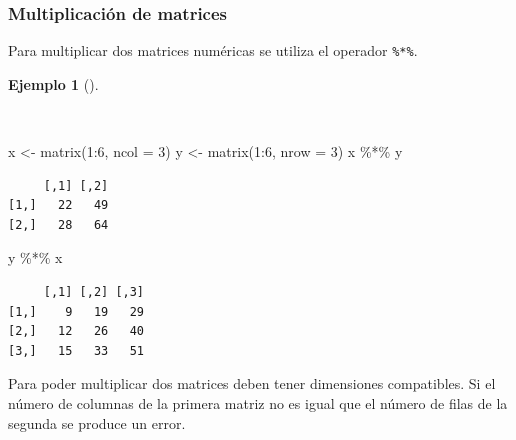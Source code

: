 \documentclass[
  a4paper,
]{scrreport}
\newenvironment{Shaded}{\begin{snugshade}}{\end{snugshade}}
\newcommand{\AttributeTok}[1]{\textcolor[rgb]{0.40,0.45,0.13}{#1}}
\newcommand{\DecValTok}[1]{\textcolor[rgb]{0.68,0.00,0.00}{#1}}
\newcommand{\FunctionTok}[1]{\textcolor[rgb]{0.28,0.35,0.67}{#1}}
\newcommand{\NormalTok}[1]{\textcolor[rgb]{0.00,0.23,0.31}{#1}}
\newcommand{\OtherTok}[1]{\textcolor[rgb]{0.00,0.23,0.31}{#1}}
\newcommand{\SpecialCharTok}[1]{\textcolor[rgb]{0.37,0.37,0.37}{#1}}
\theoremstyle{definition}
\theoremstyle{definition}
\newtheorem{example}{Ejemplo}[chapter]
\theoremstyle{remark}
\begin{document}
\subsubsection{Multiplicación de
matrices}\label{multiplicaciuxf3n-de-matrices}

Para multiplicar dos matrices numéricas se utiliza el operador
\texttt{\%*\%}.

\begin{example}[]\protect\hypertarget{exm-producto-matrices}{}\label{exm-producto-matrices}

~

\begin{Shaded}
\begin{Highlighting}[]
\NormalTok{x }\OtherTok{\textless{}{-}} \FunctionTok{matrix}\NormalTok{(}\DecValTok{1}\SpecialCharTok{:}\DecValTok{6}\NormalTok{, }\AttributeTok{ncol =} \DecValTok{3}\NormalTok{)}
\NormalTok{y }\OtherTok{\textless{}{-}} \FunctionTok{matrix}\NormalTok{(}\DecValTok{1}\SpecialCharTok{:}\DecValTok{6}\NormalTok{, }\AttributeTok{nrow =} \DecValTok{3}\NormalTok{)}
\NormalTok{x }\SpecialCharTok{\%*\%}\NormalTok{ y}
\end{Highlighting}
\end{Shaded}

\begin{verbatim}
     [,1] [,2]
[1,]   22   49
[2,]   28   64
\end{verbatim}

\begin{Shaded}
\begin{Highlighting}[]
\NormalTok{y }\SpecialCharTok{\%*\%}\NormalTok{ x}
\end{Highlighting}
\end{Shaded}

\begin{verbatim}
     [,1] [,2] [,3]
[1,]    9   19   29
[2,]   12   26   40
[3,]   15   33   51
\end{verbatim}

\end{example}

\begin{tcolorbox}[enhanced jigsaw, title=\textcolor{quarto-callout-warning-color}{\faExclamationTriangle}\hspace{0.5em}{Advertencia}, titlerule=0mm, toprule=.15mm, colbacktitle=quarto-callout-warning-color!10!white, arc=.35mm, colframe=quarto-callout-warning-color-frame, opacitybacktitle=0.6, coltitle=black, left=2mm, colback=white, opacityback=0, breakable, bottomrule=.15mm, toptitle=1mm, leftrule=.75mm, bottomtitle=1mm, rightrule=.15mm]

Para poder multiplicar dos matrices deben tener dimensiones compatibles.
Si el número de columnas de la primera matriz no es igual que el número
de filas de la segunda se produce un error.

\end{tcolorbox}
\end{document}
